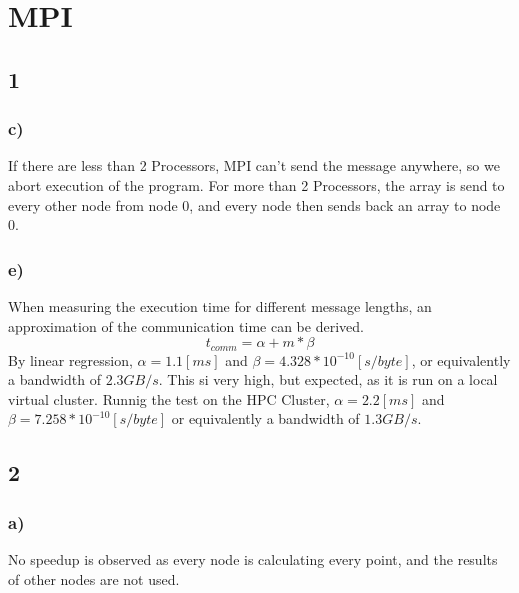 \documentclass{article}
\begin{document}
\section{MPI}
\subsection{1}
\subsubsection{c)}
If there are less than 2 Processors, MPI can't send the message anywhere, so we abort execution of the program.
For more than 2 Processors, the array is send to every other node from node 0, and every node then sends back an array to node 0.
\subsubsection{e)}
When measuring the execution time for different message lengths, an approximation of the communication time can be derived.
\begin{equation}
	t_{comm} = \alpha + m * \beta
\end{equation}
By linear regression, $\alpha = 1.1 [ms]$ and $\beta = 4.328*10^{-10} [s/byte]$, or equivalently a bandwidth of $2.3 GB/s$. This si very high, but expected, as it is run on a local virtual cluster.
Runnig the test on the HPC Cluster, $\alpha = 2.2 [ms]$ and $\beta = 7.258*10^{-10} [s/byte]$ or equivalently a bandwidth of $1.3 GB/s$.

\subsection{2}
\subsubsection{a)}
No speedup is observed as every node is calculating every point, and the results of other nodes are not used.
\end{document}
